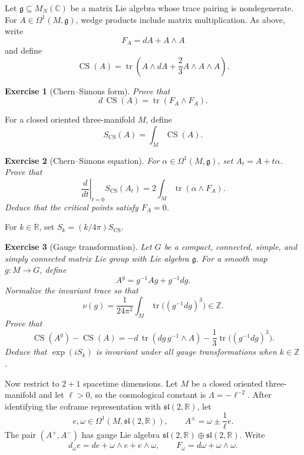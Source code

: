 \documentclass{article}
\newtheorem{exercise}{Exercise}
\begin{document}
Let $\mathfrak g\subseteq M_N(\mathbb C)$ be a matrix Lie algebra whose trace pairing is nondegenerate. For $A\in\Omega^1(M,\mathfrak g)$, wedge products include matrix multiplication. As above, write
\[
F_A=dA+A\wedge A
\]
and define
\[
\operatorname{CS}(A)
=\operatorname{tr}\left(
A\wedge dA+\frac23A\wedge A\wedge A
\right).
\]

\begin{exercise}[Chern--Simons form]\leavevmode\par
\textit{Prove that}
\[
d\,\operatorname{CS}(A)
=\operatorname{tr}(F_A\wedge F_A).
\]
\end{exercise}

For a closed oriented three-manifold $M$, define
\[
S_{\mathrm{CS}}(A)=\int_M\operatorname{CS}(A).
\]

\begin{exercise}[Chern--Simons equation]\leavevmode\par
\textit{For $\alpha\in\Omega^1(M,\mathfrak g)$, set $A_t=A+t\alpha$. Prove that}
\[
\left.\frac{d}{dt}\right|_{t=0}S_{\mathrm{CS}}(A_t)
=2\int_M\operatorname{tr}(\alpha\wedge F_A).
\]
\textit{Deduce that the critical points satisfy $F_A=0$.}
\end{exercise}

For $k\in\mathbb R$, set $S_k=(k/4\pi)S_{\mathrm{CS}}$.

\begin{exercise}[Gauge transformation]\leavevmode\par
\textit{Let $G$ be a compact, connected, simple, and simply connected matrix
Lie group with Lie algebra $\mathfrak g$. For a smooth map $g:M\to G$, define}
\[
A^g=g^{-1}Ag+g^{-1}dg.
\]
\textit{Normalize the invariant trace so that}
\[
\nu(g)=\frac{1}{24\pi^2}\int_M
\operatorname{tr}\bigl((g^{-1}dg)^3\bigr)\in\mathbb Z.
\]
\textit{Prove that}
\[
\operatorname{CS}(A^g)-\operatorname{CS}(A)
=-d\,\operatorname{tr}(dg\,g^{-1}\wedge A)
-\frac13\operatorname{tr}\bigl((g^{-1}dg)^3\bigr).
\]
\textit{Deduce that $\exp(iS_k)$ is invariant under all gauge transformations when $k\in\mathbb Z$.}
\end{exercise}

Now restrict to $2+1$ spacetime dimensions. Let $M$ be a closed oriented three-manifold and let $\ell>0$, so the cosmological constant is $\Lambda=-\ell^{-2}$. After identifying the coframe representation with $\mathfrak{sl}(2,\mathbb R)$, let
\[
e,\omega\in\Omega^1(M,\mathfrak{sl}(2,\mathbb R)),
\qquad
A^\pm=\omega\pm\frac1\ell e.
\]
The pair $(A^+,A^-)$ has gauge Lie algebra $\mathfrak{sl}(2,\mathbb R)\oplus\mathfrak{sl}(2,\mathbb R)$.
Write
\[
d_\omega e=de+\omega\wedge e+e\wedge\omega,
\qquad
F_\omega=d\omega+\omega\wedge\omega.
\]
\end{document}
